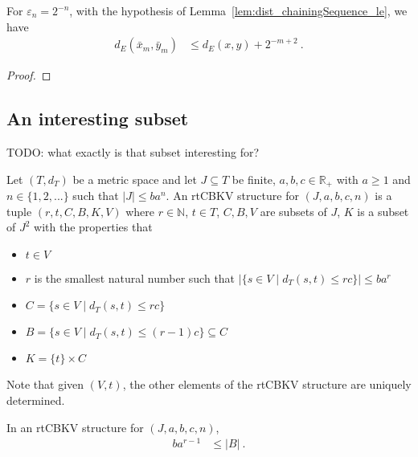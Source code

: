 \begin{corollary}\label{cor:dist_chainingSequence_pow_two_le}
For $\varepsilon_n = 2^{-n}$, with the hypothesis of Lemma~\ref{lem:dist_chainingSequence_le}, we have
\begin{align*}
  d_E(\bar{x}_m, \bar{y}_m)
  &\le d_E(x, y) + 2^{-m+2}
  \: .
\end{align*}
\end{corollary}

\begin{proof}

\end{proof}


\subsection{An interesting subset}

TODO: what exactly is that subset interesting for?

\begin{definition}\label{def:rtCBKV}
Let $(T,d_T)$ be a metric space and let $J \subseteq T$ be finite, $a,b,c \in \mathbb R_+$ with $a \ge 1$ and $n \in \{1, 2, ...\}$ such that $|J| \le b a^n$.
An rtCBKV structure for $(J, a, b, c, n)$ is a tuple $(r, t, C, B, K, V)$ where $r \in \mathbb{N}$, $t \in T$, $C, B, V$ are subsets of $J$, $K$ is a subset of $J^2$ with the properties that
\begin{itemize}
  \item $t \in V$
  \item $r$ is the smallest natural number such that $\vert\{s \in V \mid d_T(s, t) \le r c\}\vert \le b a^r$
  \item $C = \{s \in V \mid d_T(s, t) \le r c\}$
  \item $B = \{s \in V \mid d_T(s, t) \le (r-1) c\} \subseteq C$
  \item $K = \{t\} \times C$
\end{itemize}
Note that given $(V, t)$, the other elements of the rtCBKV structure are uniquely determined.
\end{definition}


\begin{lemma}\label{lem:card_B_ge}
In an rtCBKV structure for $(J, a, b, c, n)$,
\begin{align*}
  b a^{r-1}
  &\le \vert B \vert
  \: .
\end{align*}
\end{lemma}

